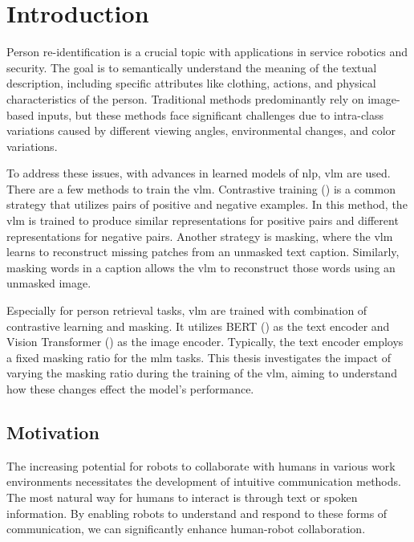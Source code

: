 \chapter{Introduction}
Person re-identification is a crucial topic with applications in service robotics and security. The goal is to semantically understand the meaning of the textual description, including specific attributes like clothing, actions, and physical characteristics of the person. Traditional methods predominantly rely on image-based inputs, but these methods face significant challenges due to intra-class variations caused by different viewing angles, environmental changes, and color variations.

To address these issues, with advances in learned models of \acrfull{nlp}, \acrfull{vlm} are used. There are a few methods to train the \acrshort{vlm}. 
Contrastive training (\cite{khosla2021supervisedcontrastivelearning}) is a common strategy that utilizes pairs of positive and negative examples. In this method, the \acrshort{vlm} is trained to produce similar representations for positive pairs and different representations for negative pairs. Another strategy is masking, where the \acrshort{vlm} learns to reconstruct missing patches from an unmasked text caption. Similarly, masking words in a caption allows the \acrshort{vlm} to reconstruct those words using an unmasked image.


Especially for person retrieval tasks, \acrshort{vlm} are trained with combination of contrastive learning and masking. It utilizes BERT (\cite{devlin2018bert}) as the text encoder and Vision Transformer (\cite{dosovitskiy2021image}) as the image encoder. Typically, the text encoder employs a fixed masking ratio for the \acrfull{mlm} tasks. This thesis investigates the impact of varying the masking ratio during the training of the \acrshort{vlm}, aiming to understand how these changes effect the model's performance.

\section{Motivation}
The increasing potential for robots to collaborate with humans in various work environments necessitates the development of intuitive communication methods. The most natural way for humans to interact is through text or spoken information. By enabling robots to understand and respond to these forms of communication, we can significantly enhance human-robot collaboration.

